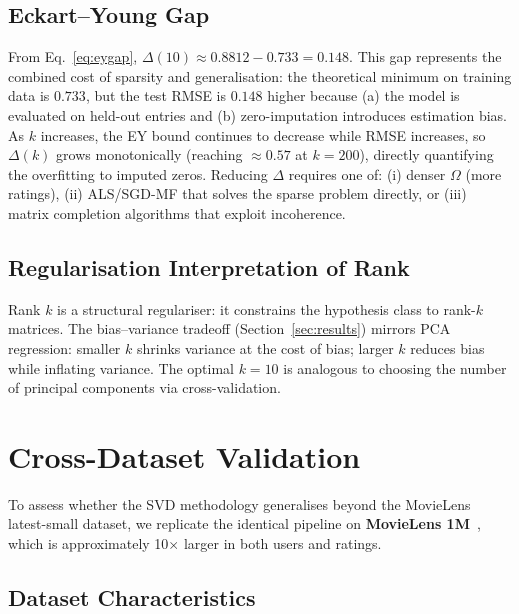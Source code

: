 \documentclass[12pt, a4paper]{article}
\newcommand{\Om}{\Omega}
\begin{document}
\subsection{Eckart--Young Gap}

From Eq.~\eqref{eq:eygap}, $\Delta(10) \approx 0.8812 - 0.733 = 0.148$.
This gap represents the combined cost of sparsity and generalisation:
the theoretical minimum on training data is $0.733$, but the test RMSE
is $0.148$ higher because (a) the model is evaluated on held-out entries
and (b) zero-imputation introduces estimation bias.
As $k$ increases, the EY bound continues to decrease while RMSE
increases, so $\Delta(k)$ grows monotonically (reaching $\approx 0.57$
at $k=200$), directly quantifying the overfitting to imputed zeros.
Reducing $\Delta$ requires one of:
(i) denser $\Om$ (more ratings),
(ii) ALS/SGD-MF that solves the sparse problem directly, or
(iii) matrix completion algorithms that exploit incoherence.

\subsection{Regularisation Interpretation of Rank}

Rank $k$ is a structural regulariser: it constrains the hypothesis class
to rank-$k$ matrices.  The bias--variance tradeoff (Section~\ref{sec:results})
mirrors PCA regression: smaller $k$ shrinks variance at the cost of
bias; larger $k$ reduces bias while inflating variance.
The optimal $k=10$ is analogous to choosing the number of principal
components via cross-validation.

\section{Cross-Dataset Validation}
\label{sec:crossval}

To assess whether the SVD methodology generalises beyond the MovieLens
latest-small dataset, we replicate the identical pipeline on
\textbf{MovieLens 1M}~\citep{harper2015movielens}, which is approximately
10$\times$ larger in both users and ratings.

\subsection{Dataset Characteristics}
\end{document}

